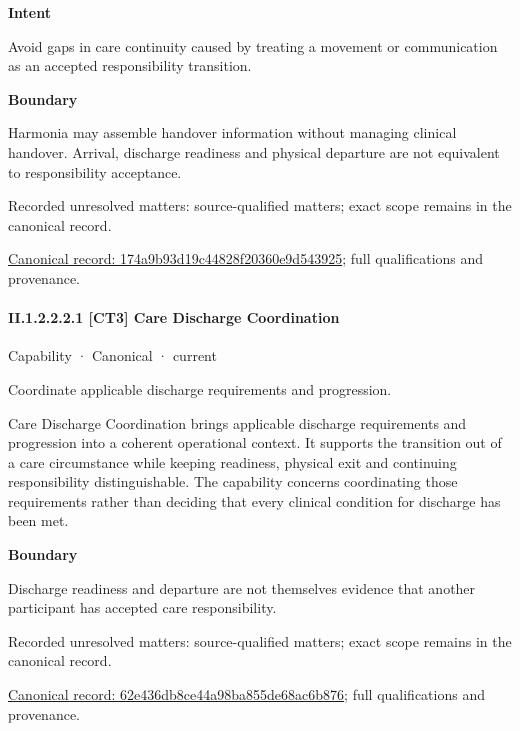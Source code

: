 \textbf{Intent}



Avoid gaps in care continuity caused by treating a movement or communication as an accepted responsibility transition.



\textbf{Boundary}



Harmonia may assemble handover information without managing clinical handover. Arrival, discharge readiness and physical departure are not equivalent to responsibility acceptance.


{\small Recorded unresolved matters: source-qualified matters; exact scope remains in the canonical record.}\par
{\footnotesize \href{../../../../continuum/strategy/capability/174a9b93d19c44828f20360e9d543925.md}{Canonical record: 174a9b93d19c44828f20360e9d543925}; full qualifications and provenance.}\par
\paragraph*{II.1.2.2.2.1 [CT3] Care Discharge Coordination}
\label{navigation:II.1.2.2.2.1}

\label{element:62e436db8ce44a98ba855de68ac6b876}
{\small Capability · Canonical · current}\par

Coordinate applicable discharge requirements and progression.



Care Discharge Coordination brings applicable discharge requirements and progression into a coherent operational context. It supports the transition out of a care circumstance while keeping readiness, physical exit and continuing responsibility distinguishable. The capability concerns coordinating those requirements rather than deciding that every clinical condition for discharge has been met.



\textbf{Boundary}



Discharge readiness and departure are not themselves evidence that another participant has accepted care responsibility.


{\small Recorded unresolved matters: source-qualified matters; exact scope remains in the canonical record.}\par
{\footnotesize \href{../../../../continuum/strategy/capability/62e436db8ce44a98ba855de68ac6b876.md}{Canonical record: 62e436db8ce44a98ba855de68ac6b876}; full qualifications and provenance.}\par
